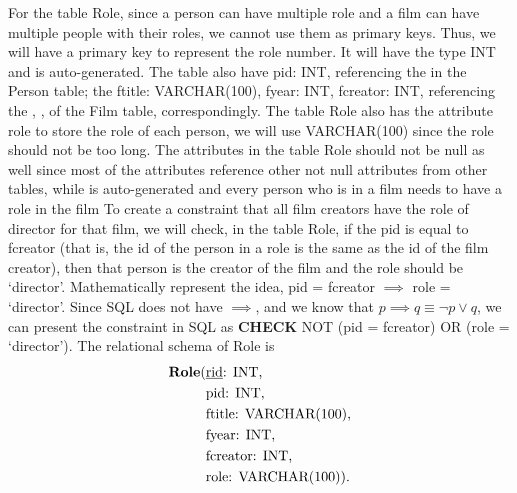\documentclass{article}
\newcommand{\key}[1]{\underline{\smash{#1}}}
\begin{document}
For the table Role, since a person can have multiple role and a film can have
multiple people with their roles, we cannot use them as primary keys. Thus, we
will have a primary key \key{rid} to represent the role number. It will have the
type INT and is auto-generated. The table also have pid: INT, referencing the
\key{id} in the Person table; the ftitle: VARCHAR(100), fyear: INT, fcreator:
INT, referencing the \key{title}, \key{year}, \key{creator} of the Film table,
correspondingly. The table Role also has the attribute role to store the role of
each person, we will use VARCHAR(100) since the role should not be too long. The
attributes in the table Role should not be null as well since most of the
attributes reference other not null attributes from other tables, while
\key{rid} is auto-generated and every person who is in a film needs to have a
role in the film To create a constraint that all film creators have the role of
director for that film, we will check, in the table Role, if the pid is equal to
fcreator (that is, the id of the person in a role is the same as the id of the
film creator), then that person is the creator of the film and the role should
be `director'. Mathematically represent the idea, pid = fcreator $\implies$ role
= `director'. Since SQL does not have $\implies$, and we know that $p \implies q
\equiv \neg p \lor q$, we can present the constraint in SQL as \textbf{CHECK}
NOT (pid = fcreator) OR (role = `director'). The relational schema of Role is
\begin{align*}
    \text{\textbf{Role}(} & \text{\key{rid}: INT,} \\
                          & \text{pid: INT,} \\
                          & \text{ftitle: VARCHAR(100),} \\
                          & \text{fyear: INT,} \\
                          & \text{fcreator: INT,} \\
                          & \text{role: VARCHAR(100)).} \\
\end{align*}
\end{document}

